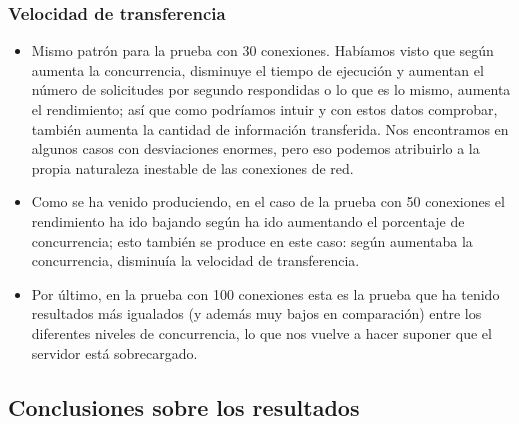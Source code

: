 \subsubsection{Velocidad de transferencia}
\begin{itemize}
	\item Mismo patrón para la prueba con 30 conexiones. Habíamos visto que según aumenta la concurrencia, disminuye el tiempo de ejecución y aumentan el número de solicitudes por segundo respondidas o lo que es lo mismo, aumenta el rendimiento; así que como podríamos intuir y con estos datos comprobar, también aumenta la cantidad de información transferida. Nos encontramos en algunos casos con desviaciones enormes, pero eso podemos atribuirlo a la propia naturaleza inestable de las conexiones de red.
	\item Como se ha venido produciendo, en el caso de la prueba con 50 conexiones el rendimiento ha ido bajando según ha ido aumentando el porcentaje de concurrencia; esto también se produce en este caso: según aumentaba la concurrencia, disminuía la velocidad de transferencia.
	\item Por último, en la prueba con 100 conexiones esta es la prueba que ha tenido resultados más igualados (y además muy bajos en comparación) entre los diferentes niveles de concurrencia, lo que nos vuelve a hacer suponer que el servidor está sobrecargado.
\end{itemize}

\subsection{Conclusiones sobre los resultados}
